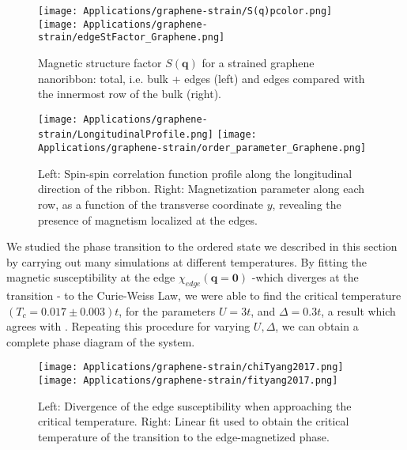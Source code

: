 \begin{figure}[H]
\hspace{0.3cm}
\texttt{[image: Applications/graphene-strain/S(q)pcolor.png]}
\texttt{[image: Applications/graphene-strain/edgeStFactor\_Graphene.png]}
	\caption[Magnetic structure factor $S(\bm q)$ for a strained graphene nanoribbon: bulk and edges.]{Magnetic structure factor $S(\bm q)$ for a strained graphene nanoribbon: total, i.e. bulk + edges (left) and edges compared with the innermost row of the bulk (right).}
	\label{fig:edgeStFactor}
\end{figure}
\begin{figure}[H]
\texttt{[image: Applications/graphene-strain/LongitudinalProfile.png]}
\texttt{[image: Applications/graphene-strain/order\_parameter\_Graphene.png]}
	\caption[Spin-spin correlation function profile along the longitudinal direction $x$ of the ribbon. Magnetization parameter along each row, as a function of the transverse coordinate $y$.
	]{Left: Spin-spin correlation function profile along the longitudinal direction of the ribbon. Right: Magnetization parameter along each row, as a function of the transverse coordinate $y$, revealing the presence of magnetism localized at the edges.}
	\label{fig:longProf}
\end{figure}
We studied the phase transition to the ordered state we described in this section by carrying out many simulations at different temperatures.
By fitting the magnetic susceptibility at the edge $\chi_{edge} (\bm q = \bm 0)$ -which diverges at the transition - to the Curie-Weiss Law, we were able to find the critical temperature $(T_c = 0.017 \pm 0.003) t$, for the parameters $U = 3 t$, and $\Delta = 0.3 t$, a result which agrees with \cite{yang_strain-tuning_2017}.
Repeating this procedure for varying $U, \Delta$, we can obtain a complete phase diagram of the system.
\begin{figure}[H]
\hspace{0.2cm}
\texttt{[image: Applications/graphene-strain/chiTyang2017.png]}
\texttt{[image: Applications/graphene-strain/fityang2017.png]}
	\caption[Divergence of the edge susceptibility when approaching the critical temperature. Linear fit used to obtain the critical temperature of the transition to the edge-magnetized phase.]{Left: Divergence of the edge susceptibility when approaching the critical temperature. 
	Right: Linear fit used to obtain the critical temperature of the transition to the edge-magnetized phase.}
	\label{fig:chiFit}
\end{figure}

